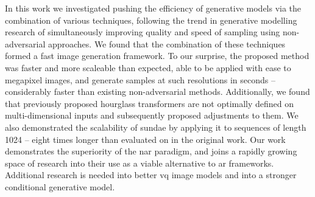 In this work we investigated pushing the efficiency of generative models via the
combination of various techniques, following the trend in generative modelling
research of simultaneously improving quality and speed of sampling using
non-adversarial approaches. We found that the combination of these techniques
formed a fast image generation framework. To our surprise, the proposed method
was faster and more scaleable than expected, able to be applied with ease to
megapixel images, and generate samples at such resolutions in seconds --
considerably faster than existing non-adversarial methods. Additionally, we
found that previously proposed hourglass transformers are not optimally defined
on multi-dimensional inputs and subsequently proposed adjustments to them. We
also demonstrated the scalability of \gls{sundae} by applying it to sequences of
length 1024 -- eight times longer than evaluated on in the original work. Our
work demonstrates the superiority of the \acrlong{nar} paradigm, and joins a
rapidly growing space of research into their use as a viable alternative to
\acrlong{ar} frameworks. Additional research is needed into better \gls{vq}
image models and into a stronger conditional generative model.
